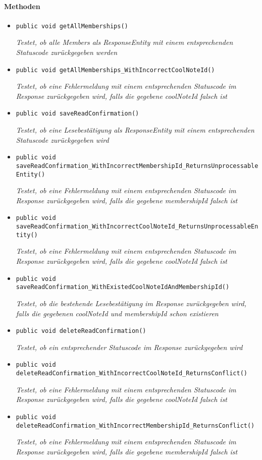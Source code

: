  \paragraph*{Methoden}
 \begin{itemize}
 	\item{\texttt{public void getAllMemberships()}}
 	
 	\textit{Testet, ob alle Members als ResponseEntity mit einem entsprechenden Statuscode zurückgegeben werden}
 	
 	\item{\texttt{public void getAllMemberships\_WithIncorrectCoolNoteId()}}
 	
 	\textit{Testet, ob eine Fehlermeldung mit einem entsprechenden Statuscode im Response zurückgegeben wird, falls die gegebene coolNoteId falsch ist}
 	
 	\item{\texttt{public void saveReadConfirmation()}}
 	
 	\textit{Testet, ob eine Lesebestätigung als ResponseEntity mit einem entsprechenden Statuscode zurückgegeben wird}
 	
 	\item{\texttt{public void saveReadConfirmation\_WithIncorrectMembershipId\_Returns\-UnprocessableEntity()}}
 	
 	\textit{Testet, ob eine Fehlermeldung mit einem entsprechenden Statuscode im Response zurückgegeben wird, falls die gegebene membershipId falsch ist}
 	
 	\item{\texttt{public void saveReadConfirmation\_WithIncorrectCoolNoteId\_Returns\-UnprocessableEntity()}}
 	
 	\textit{Testet, ob eine Fehlermeldung mit einem entsprechenden Statuscode im Response zurückgegeben wird, falls die gegebene coolNoteId falsch ist}
 	
 	\item{\texttt{public void saveReadConfirmation\_WithExistedCoolNoteIdAndMembershipId()}}
 	
 	\textit{Testet, ob die bestehende Lesebestätigung im Response zurückgegeben wird, falls die gegebenen coolNoteId und membershipId schon existieren}
 	
 	\item{\texttt{public void deleteReadConfirmation()}}
 	
 	\textit{Testet, ob ein entsprechender Statuscode im Response zurückgegeben wird}
 	
 	\item{\texttt{public void deleteReadConfirmation\_WithIncorrectCoolNoteId\_Returns\-Conflict()}}
 	
 	\textit{Testet, ob eine Fehlermeldung mit einem entsprechenden Statuscode im Response zurückgegeben wird, falls die gegebene coolNoteId falsch ist}
 	
 	\item{\texttt{public void deleteReadConfirmation\_WithIncorrectMembershipId\_Returns\-Conflict()}}
 	
 	\textit{Testet, ob eine Fehlermeldung mit einem entsprechenden Statuscode im Response zurückgegeben wird, falls die gegebene membershipId falsch ist} 	
 \end{itemize}
 
